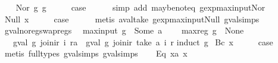 \begin{isabellebody}
\isamarkupfalse%
\isanewline
\ \ \isamarkupfalse%
\ {\isacharparenleft}Nor\ g{}\ g{}{\isacharparenright}\isanewline
\ \ \isamarkupfalse%
\ \isamarkupfalse%
\ {\isacharquery}case\isanewline
\ \ \ \ \isamarkupfalse%
\ {\isacharparenleft}simp\ add{\isacharcolon}\ maybe{\isacharunderscore}not{\isacharunderscore}eq\ gexp{\isacharunderscore}max{\isacharunderscore}input{\isacharunderscore}Nor{\isacharparenright}\isanewline
{}\isamarkupfalse%
\isanewline
\ \ \isamarkupfalse%
\ {\isacharparenleft}Null\ x{\isacharparenright}\isanewline
\ \ \isamarkupfalse%
\ \isamarkupfalse%
\ {\isacharquery}case\isanewline
\ \ \ \ \isamarkupfalse%
\ {\isacharparenleft}metis\ aval{\isacharunderscore}take\ gexp{\isacharunderscore}max{\isacharunderscore}input{\isacharunderscore}Null\ gval{\isachardot}simps{\isacharparenleft}{}{\isacharparenright}{\isacharparenright}\isanewline
{}\isamarkupfalse%
%
\endisatagproof
{\isafoldproof}%
%
\isadelimproof
\isanewline
%
\endisadelimproof
\isanewline
{}\isamarkupfalse%
\ gval{\isacharunderscore}no{\isacharunderscore}reg{\isacharunderscore}swap{\isacharunderscore}regs{\isacharcolon}\isanewline
\ \ {\isachardoublequoteopen}max{\isacharunderscore}input\ g\ {\isacharless}\ Some\ a\ {\isasymLongrightarrow}\isanewline
\ \ \ max{\isacharunderscore}reg\ g\ {\isacharequal}\ None\ {\isasymLongrightarrow}\isanewline
\ \ \ gval\ g\ {\isacharparenleft}join{\isacharunderscore}ir\ i\ ra{\isacharparenright}\ {\isacharequal}\ gval\ g\ {\isacharparenleft}join{\isacharunderscore}ir\ {\isacharparenleft}take\ a\ i{\isacharparenright}\ r{\isacharparenright}{\isachardoublequoteclose}\isanewline
%
\isadelimproof
%
\endisadelimproof
%
\isatagproof
{}\isamarkupfalse%
{\isacharparenleft}induct\ g{\isacharparenright}\isanewline
{}\isamarkupfalse%
\ {\isacharparenleft}Bc\ x{\isacharparenright}\isanewline
\ \ \isamarkupfalse%
\ \isamarkupfalse%
\ {\isacharquery}case\isanewline
\ \ \ \ \isamarkupfalse%
\ {\isacharparenleft}metis\ {\isacharparenleft}full{\isacharunderscore}types{\isacharparenright}\ gval{\isachardot}simps{\isacharparenleft}{}{\isacharparenright}\ gval{\isachardot}simps{\isacharparenleft}{}{\isacharparenright}{\isacharparenright}\isanewline
{}\isamarkupfalse%
\isanewline
\ \ \isamarkupfalse%
\ {\isacharparenleft}Eq\ x{}a\ x{}{\isacharparenright}\isanewline

\end{isabellebody}
